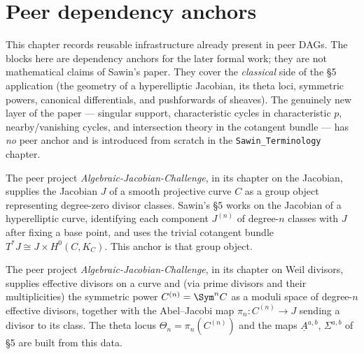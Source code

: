 \section{Peer dependency anchors}

This chapter records reusable infrastructure already present in peer DAGs.  The
blocks here are dependency anchors for the later formal work; they are not
mathematical claims of Sawin's paper.  They cover the \emph{classical} side of
the §5 application (the geometry of a hyperelliptic Jacobian, its theta loci,
symmetric powers, canonical differentials, and pushforwards of sheaves).  The
genuinely new layer of the paper --- singular support, characteristic cycles in
characteristic $p$, nearby/vanishing cycles, and intersection theory in the
cotangent bundle --- has \emph{no} peer anchor and is introduced from scratch in
the \texttt{Sawin\_Terminology} chapter.

\begin{definition}
  \label{def:peer_jacobian}
  The peer project \emph{Algebraic-Jacobian-Challenge}, in its chapter on the
  Jacobian, supplies the Jacobian $J$ of a smooth projective curve $C$ as a
  group object representing degree-zero divisor classes.  Sawin's §5 works on
  the Jacobian of a hyperelliptic curve, identifying each component $J^{(n)}$ of
  degree-$n$ classes with $J$ after fixing a base point, and uses the trivial
  cotangent bundle $T^*J \cong J \times H^0(C,K_C)$.  This anchor is that group
  object.
\end{definition}

\begin{definition}
  \label{def:peer_weil_divisor}
  The peer project \emph{Algebraic-Jacobian-Challenge}, in its chapter on Weil
  divisors, supplies effective divisors on a curve and (via prime divisors and
  their multiplicities) the symmetric power $C^{(n)} = \Sym^n C$ as a moduli
  space of degree-$n$ effective divisors, together with the Abel--Jacobi map
  $\pi_n : C^{(n)} \to J$ sending a divisor to its class.  The theta locus
  $\Theta_n = \pi_n(C^{(n)})$ and the maps $\underline A^{a,b}$, $\Sigma^{a,b}$
  of §5 are built from this data.
\end{definition}

